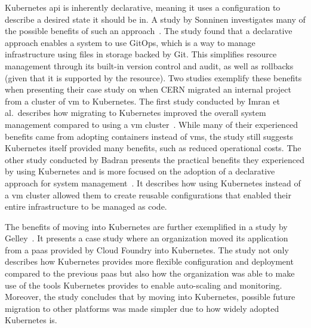 \documentclass{kththesis}
\begin{document}
Kubernetes \Gls{api} is inherently declarative, meaning it uses a configuration to describe a desired state it should be in. A study by Sonninen investigates many of the possible benefits of such an approach\ \cite{declarative-benefits}. The study found that a declarative approach enables a system to use GitOps, which is a way to manage infrastructure using files in storage backed by Git. This simplifies resource management through its built-in version control and audit, as well as rollbacks (given that it is supported by the resource). Two studies exemplify these benefits when presenting their case study on when CERN migrated an internal project from a cluster of \Gls{vm} to Kubernetes. The first study conducted by Imran et al.\ describes how migrating to Kubernetes improved the overall system management compared to using a \Gls{vm} cluster\ \cite{k8s-cern}. While many of their experienced benefits came from adopting containers instead of \Glspl{vm}, the study still suggests Kubernetes itself provided many benefits, such as reduced operational costs. The other study conducted by Badran presents the practical benefits they experienced by using Kubernetes and is more focused on the adoption of a declarative approach for system management\ \cite{k8s-cern-techreport}. It describes how using Kubernetes instead of a \Gls{vm} cluster allowed them to create reusable configurations that enabled their entire infrastructure to be managed as code. 

The benefits of moving into Kubernetes are further exemplified in a study by Gelley\ \cite{k8s-cloud-foundry}. It presents a case study where an organization moved its application from a \Gls{paas} provided by Cloud Foundry into Kubernetes. The study not only describes how Kubernetes provides more flexible configuration and deployment compared to the previous \Gls{paas} but also how the organization was able to make use of the tools Kubernetes provides to enable auto-scaling and monitoring. Moreover, the study concludes that by moving into Kubernetes, possible future migration to other platforms was made simpler due to how widely adopted Kubernetes is. 
\end{document}
